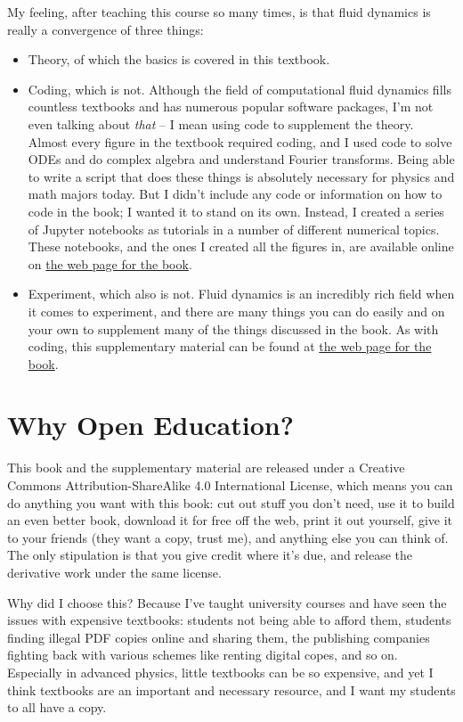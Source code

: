 \documentclass[10pt, a5paper, twoside, openany]{memoir}
\begin{document}
My feeling, after teaching this course so many times, is that fluid dynamics is really a convergence of three things: 
\begin{itemize}
\item Theory, of which the basics is covered in this textbook.
\item Coding, which is not.  Although the field of computational fluid dynamics fills countless textbooks and has numerous popular software packages, I'm not even talking about \emph{that} -- I mean using code to supplement the theory.  Almost every figure in the textbook required coding, and I used code to solve ODEs and do complex algebra and understand Fourier transforms.  Being able to write a script that does these things is absolutely necessary for physics and math majors today.  But I didn't include any code or information on how to code in the book; I wanted it to stand on its own.  Instead, I created a series of Jupyter notebooks as tutorials in a number of different numerical topics.  These notebooks, and the ones I created all the figures in, are available online on \href{https://josephmacmillan.github.io/IntroductionToFluidDynamics/index.html}{the web page for the book}.
\item Experiment, which also is not.  Fluid dynamics is an incredibly rich field when it comes to experiment, and there are many things you can do easily and on your own to supplement many of the things discussed in the book.  As with coding, this supplementary material can be found at \href{https://josephmacmillan.github.io/IntroductionToFluidDynamics/index.html}{the web page for the book}.
\end{itemize}

\section{Why Open Education?}

This book and the supplementary material are released under a Creative Commons Attribution-ShareAlike 4.0 International License, which means you can do anything you want with this book:  cut out stuff you don't need, use it to build an even better book, download it for free off the web, print it out yourself, give it to your friends (they want a copy, trust me), and anything else you can think of.  The only stipulation is that you give credit where it's due, and release the derivative work under the same license.

Why did I choose this?  Because I've taught university courses and have seen the issues with expensive textbooks: students not being able to afford them, students finding illegal PDF copies online and sharing them, the publishing companies fighting back with various schemes like renting digital copes, and so on.  Especially in advanced physics, little textbooks can be so expensive, and yet I think textbooks are an important and necessary resource, and I want my students to all have a copy.
\end{document}
